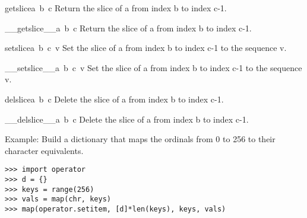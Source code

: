 \begin{funcdesc}{getslice}{a\, b\, c}
Return the slice of a from index b to index c-1.
\end{funcdesc}

\begin{funcdesc}{\_\_getslice\_\_}{a\, b\, c}
Return the slice of a from index b to index c-1.
\end{funcdesc}

\begin{funcdesc}{setslice}{a\, b\, c\, v}
Set the slice of a from index b to index c-1 to the sequence v.
\end{funcdesc}

\begin{funcdesc}{\_\_setslice\_\_}{a\, b\, c\, v}
Set the slice of a from index b to index c-1 to the sequence v.
\end{funcdesc}

\begin{funcdesc}{delslice}{a\, b\, c}
Delete the slice of a from index b to index c-1.
\end{funcdesc}

\begin{funcdesc}{\_\_delslice\_\_}{a\, b\, c}
Delete the slice of a from index b to index c-1.
\end{funcdesc}

Example: Build a dictionary that maps the ordinals from 0 to 256 to their
character equivalents.

\begin{verbatim}
>>> import operator
>>> d = {}
>>> keys = range(256)
>>> vals = map(chr, keys)
>>> map(operator.setitem, [d]*len(keys), keys, vals)
\end{verbatim}
